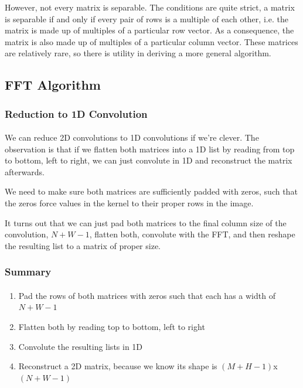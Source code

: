 \documentclass{beamer}                             %
\begin{document}
\begin{frame}
\frametitle{}
\framesubtitle{}
However, not every matrix is separable. The conditions are quite strict,
a matrix is separable if and only if every pair of rows is a multiple of each
other, i.e. the matrix is made up of multiples of a particular row vector.
As a consequence, the matrix is also made up of multiples of a particular
column vector. These matrices are relatively rare, so there is utility
in deriving a more general algorithm.
\end{frame}

\subsection{FFT Algorithm}
\begin{frame}
\frametitle{Reduction to 1D Convolution}
\framesubtitle{}
We can reduce 2D convolutions to 1D convolutions if we're clever.
The observation is that if we \alert{flatten} both matrices into a 1D list
by reading from top to bottom, left to right, we can just convolute in 1D
and reconstruct the matrix afterwards. \pause

We need to make sure both matrices are sufficiently padded with zeros, such that
the zeros force values in the kernel to their proper rows in the image. \pause

It turns out that we can just pad both matrices
to the final column size of the convolution, 
\( N + W - 1 \), flatten both, convolute with the FFT, and then reshape the
resulting list to a matrix of proper size.
\end{frame}

\begin{frame}
\frametitle{Summary}
\framesubtitle{}
\begin{enumerate}[<+->]
  \item Pad the rows of both matrices with zeros such that
    each has a width of \( N + W - 1 \)
  \item Flatten both by reading top to bottom, left to right
  \item Convolute the resulting lists in 1D
  \item Reconstruct a 2D matrix, because we know its shape is
    \( (M + H - 1) \)x\( (N + W - 1) \)
\end{enumerate}
\end{frame}
\end{document}
